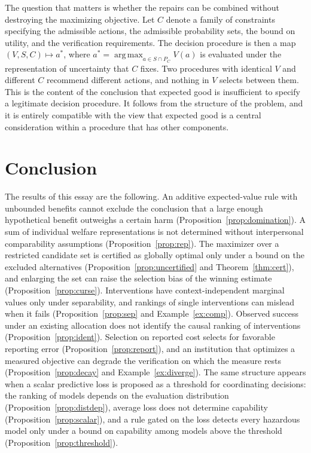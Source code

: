\documentclass[11pt]{article}
\theoremstyle{definition}
\theoremstyle{remark}
\DeclareMathOperator*{\argmax}{arg\,max}
\begin{document}
The question that matters is whether the repairs can be combined without destroying the maximizing objective. Let $C$ denote a family of constraints specifying the admissible actions, the admissible probability sets, the bound on utility, and the verification requirements. The decision procedure is then a map $(V,S,C)\mapsto a^{*}$, where $a^{*}=\argmax_{a\in S\cap P_C}V(a)$ is evaluated under the representation of uncertainty that $C$ fixes. Two procedures with identical $V$ and different $C$ recommend different actions, and nothing in $V$ selects between them. This is the content of the conclusion that expected good is insufficient to specify a legitimate decision procedure. It follows from the structure of the problem, and it is entirely compatible with the view that expected good is a central consideration within a procedure that has other components.

\section{Conclusion}
\label{sec:conclusion}

The results of this essay are the following. An additive expected-value rule with unbounded benefits cannot exclude the conclusion that a large enough hypothetical benefit outweighs a certain harm (Proposition~\ref{prop:domination}). A sum of individual welfare representations is not determined without interpersonal comparability assumptions (Proposition~\ref{prop:rep}). The maximizer over a restricted candidate set is certified as globally optimal only under a bound on the excluded alternatives (Proposition~\ref{prop:uncertified} and Theorem~\ref{thm:cert}), and enlarging the set can raise the selection bias of the winning estimate (Proposition~\ref{prop:curse}). Interventions have context-independent marginal values only under separability, and rankings of single interventions can mislead when it fails (Proposition~\ref{prop:sep} and Example~\ref{ex:comp}). Observed success under an existing allocation does not identify the causal ranking of interventions (Proposition~\ref{prop:ident}). Selection on reported cost selects for favorable reporting error (Proposition~\ref{prop:report}), and an institution that optimizes a measured objective can degrade the verification on which the measure rests (Proposition~\ref{prop:decay} and Example~\ref{ex:diverge}). The same structure appears when a scalar predictive loss is proposed as a threshold for coordinating decisions: the ranking of models depends on the evaluation distribution (Proposition~\ref{prop:distdep}), average loss does not determine capability (Proposition~\ref{prop:scalar}), and a rule gated on the loss detects every hazardous model only under a bound on capability among models above the threshold (Proposition~\ref{prop:threshold}).
\end{document}

